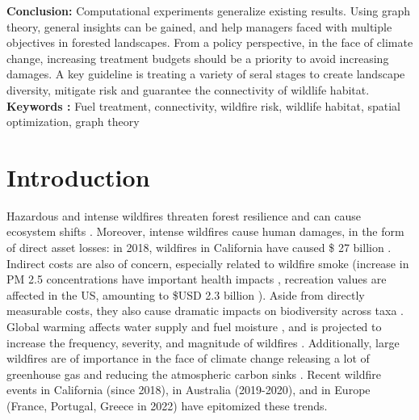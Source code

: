 \begin{center}
\begin{minipage}{0.9\textwidth}
 \textbf{Conclusion:} Computational experiments generalize existing results. Using graph theory, general insights can be gained, and help managers faced with multiple objectives in forested landscapes. From a policy perspective, in the face of climate change, increasing treatment budgets should be a priority to avoid increasing damages. A key guideline is treating a variety of seral stages to create landscape diversity, mitigate risk and guarantee the connectivity of wildlife habitat. 
\\
\textbf{Keywords : }Fuel treatment, connectivity, wildfire risk, wildlife habitat, spatial optimization, graph theory
\end{minipage}
\end{center}

\vfill
\newpage

\onehalfspacing
\section{Introduction}
Hazardous and intense wildfires threaten forest resilience and can cause ecosystem shifts \citep{coop_wildfire-driven_2020}. 
Moreover, intense wildfires cause human damages, in the form of direct asset losses: in 2018, wildfires in California have caused \$ 27 billion \citep{wang_economic_2021}. Indirect costs are also of concern, especially related to wildfire smoke (increase in PM 2.5 concentrations have important health impacts \citep{burke_wildfire_2023, heft-neal_behavior_2023}, recreation values are affected in the US, amounting to \$USD 2.3 billion \citep{Gellman}). Aside from directly measurable costs, they also cause dramatic impacts on biodiversity across taxa \citep{Wintle2020}. Global warming affects water supply and fuel moisture \citep{jolly_climate-induced_2015, Abatzoglou, ruffault_extreme_2018}, and is projected to increase the frequency, severity, and magnitude of wildfires \citep{ wasserman_climate_2023}. Additionally, large wildfires are of importance in the face of climate change releasing a lot of greenhouse gas and reducing the atmospheric carbon sinks \citep{zheng_record-high_2023, sweeney_estimating_2023}. Recent wildfire events in California (since 2018), in Australia (2019-2020), and in Europe (France, Portugal, Greece in 2022) have epitomized these trends. 

